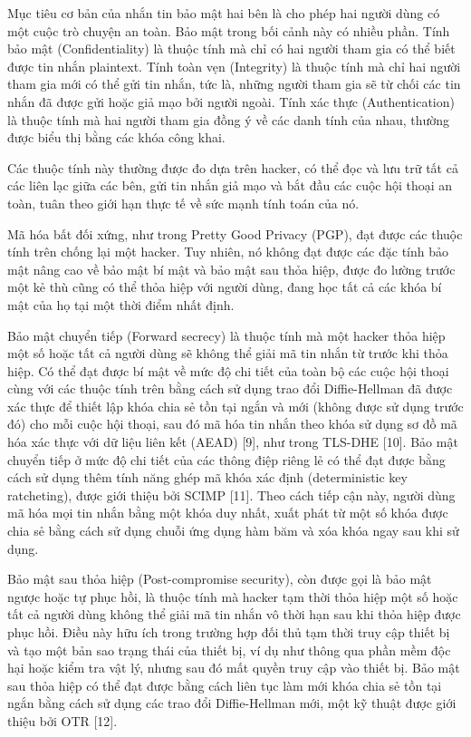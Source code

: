 \documentclass[../main-report.tex]{subfiles}
\begin{document}
Mục tiêu cơ bản của nhắn tin bảo mật hai bên là cho phép hai người dùng có một cuộc trò chuyện an toàn. Bảo mật trong bối cảnh này có nhiều phần. Tính bảo mật (\gls{Confidentiality}) là thuộc tính mà chỉ có hai người tham gia có thể biết được tin nhắn plaintext. Tính toàn vẹn (\gls{Integrity}) là thuộc tính mà chỉ hai người tham gia mới có thể gửi tin nhắn, tức là, những người tham gia sẽ từ chối các tin nhắn đã được gửi hoặc giả mạo bởi người ngoài. Tính xác thực (\gls{Authentication}) là thuộc tính mà hai người tham gia đồng ý về các danh tính của nhau, thường được biểu thị bằng các khóa công khai.

Các thuộc tính này thường được đo dựa trên hacker, có thể đọc và lưu trữ tất cả các liên lạc giữa các bên, gửi tin nhắn giả mạo và bắt đầu các cuộc hội thoại an toàn, tuân theo giới hạn thực tế về sức mạnh tính toán của nó.

Mã hóa bất đối xứng, như trong Pretty Good Privacy (\gls{PGP}), đạt được các thuộc tính trên chống lại một hacker. Tuy nhiên, nó không đạt được các đặc tính bảo mật nâng cao về bảo mật bí mật và bảo mật sau thỏa hiệp, được đo lường trước một kẻ thù cũng có thể thỏa hiệp với người dùng, đang học tất cả các khóa bí mật của họ tại một thời điểm nhất định.

Bảo mật chuyển tiếp (Forward secrecy) là thuộc tính mà một hacker thỏa hiệp một số hoặc tất cả người dùng sẽ không thể giải mã tin nhắn từ trước khi thỏa hiệp. Có thể đạt được bí mật về mức độ chi tiết của toàn bộ các cuộc hội thoại cùng với các thuộc tính trên bằng cách sử dụng trao đổi Diffie-Hellman đã được xác thực để thiết lập khóa chia sẻ tồn tại ngắn và mới (không được sử dụng trước đó) cho mỗi cuộc hội thoại, sau đó mã hóa tin nhắn theo khóa sử dụng sơ đồ mã hóa xác thực với dữ liệu liên kết (AEAD) [9], như trong TLS-DHE [10]. Bảo mật chuyển tiếp ở mức độ chi tiết của các thông điệp riêng lẻ có thể đạt được bằng cách sử dụng thêm tính năng ghép mã khóa xác định (deterministic key ratcheting), được giới thiệu bởi SCIMP [11]. Theo cách tiếp cận này, người dùng mã hóa mọi tin nhắn bằng một khóa duy nhất, xuất phát từ một số khóa được chia sẻ bằng cách sử dụng chuỗi ứng dụng hàm băm và xóa khóa ngay sau khi sử dụng.

Bảo mật sau thỏa hiệp (Post-compromise security), còn được gọi là bảo mật ngược hoặc tự phục hồi, là thuộc tính mà hacker tạm thời thỏa hiệp một số hoặc tất cả người dùng không thể giải mã tin nhắn vô thời hạn sau khi thỏa hiệp được phục hồi. Điều này hữu ích trong trường hợp đối thủ tạm thời truy cập thiết bị và tạo một bản sao trạng thái của thiết bị, ví dụ như thông qua phần mềm độc hại hoặc kiểm tra vật lý, nhưng sau đó mất quyền truy cập vào thiết bị. Bảo mật sau thỏa hiệp có thể đạt được bằng cách liên tục làm mới khóa chia sẻ tồn tại ngắn bằng cách sử dụng các trao đổi Diffie-Hellman mới, một kỹ thuật được giới thiệu bởi OTR [12].
\end{document}

